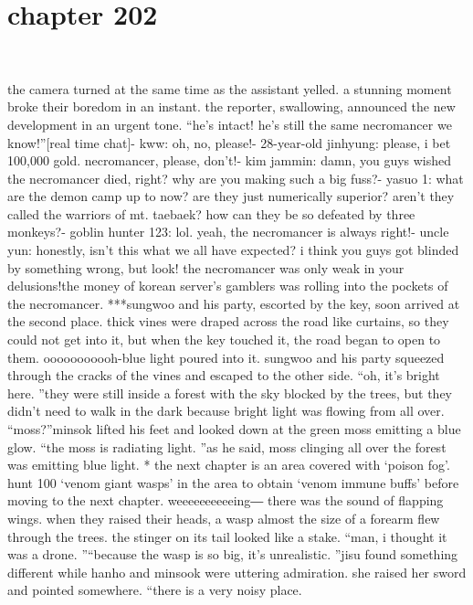 \section{chapter 202}

                             




the camera turned at the same time as the assistant yelled.
a stunning moment broke their boredom in an instant.
the reporter, swallowing, announced the new development in an urgent tone.
“he’s intact! he’s still the same necromancer we know!”[real time chat]- kww: oh, no, please!- 28-year-old jinhyung: please, i bet 100,000 gold.
 necromancer, please, don’t!- kim jammin: damn, you guys wished the necromancer died, right? why are you making such a big fuss?- yasuo 1: what are the demon camp up to now? are they just numerically superior? aren’t they called the warriors of mt.
 taebaek? how can they be so defeated by three monkeys?- goblin hunter 123: lol.
 yeah, the necromancer is always right!- uncle yun: honestly, isn’t this what we all have expected? i think you guys got blinded by something wrong, but look! the necromancer was only weak in your delusions!the money of korean server’s gamblers was rolling into the pockets of the necromancer.
***sungwoo and his party, escorted by the key, soon arrived at the second place.
 thick vines were draped across the road like curtains, so they could not get into it, but when the key touched it, the road began to open to them.
ooooooooooh-blue light poured into it.
 sungwoo and his party squeezed through the cracks of the vines and escaped to the other side.
“oh, it’s bright here.
”they were still inside a forest with the sky blocked by the trees, but they didn’t need to walk in the dark because bright light was flowing from all over.
“moss?”minsok lifted his feet and looked down at the green moss emitting a blue glow.
“the moss is radiating light.
”as he said, moss clinging all over the forest was emitting blue light.
* the next chapter is an area covered with ‘poison fog’.
 hunt 100 ‘venom giant wasps’ in the area to obtain ‘venom immune buffs’ before moving to the next chapter.
weeeeeeeeeeing―
there was the sound of flapping wings.
 when they raised their heads, a wasp almost the size of a forearm flew through the trees.
 the stinger on its tail looked like a stake.
“man, i thought it was a drone.
”“because the wasp is so big, it’s unrealistic.
”jisu found something different while hanho and minsook were uttering admiration.
she raised her sword and pointed somewhere.
“there is a very noisy place.
